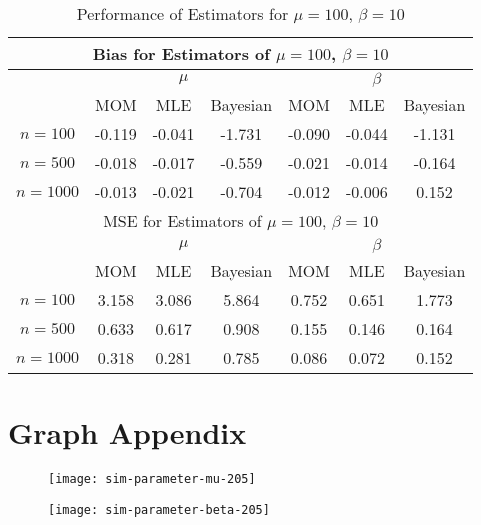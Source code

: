 \documentclass{svproc}
\begin{document}
\begin{table}[H]
\begin{center}
\caption{Performance of Estimators for $\mu = 100$, $\beta = 10$}
\begin{tabular}{|c|c|c|c|c|c|c|}
\hline
\multicolumn{7}{|c|}{Bias for Estimators of $\mu = 100$, $\beta = 10$}\\
\hline
  &\multicolumn{3}{|c|}{$\mu$} &\multicolumn{3}{|c|}{$\beta$}\\
\hline
 & MOM & MLE & Bayesian & MOM & MLE & Bayesian \\
\hline
$n = 100$ & -0.119 & -0.041 & -1.731 & -0.090 & -0.044 & -1.131\\
\hline
$n = 500$ & -0.018 & -0.017 & -0.559 & -0.021 & -0.014 & -0.164\\
\hline
$n = 1000$ & -0.013 & -0.021 & -0.704 & -0.012 & -0.006 & 0.152\\
\hline
\hline
\multicolumn{7}{|c|}{MSE for Estimators of $\mu = 100$, $\beta = 10$}\\
\hline
  &\multicolumn{3}{|c|}{$\mu$} &\multicolumn{3}{|c|}{$\beta$}\\
\hline
 & MOM & MLE & Bayesian & MOM & MLE & Bayesian \\
\hline
$n = 100$ & 3.158 & 3.086 & 5.864 & 0.752 & 0.651 & 1.773\\
\hline
$n = 500$ & 0.633 & 0.617 & 0.908 & 0.155 & 0.146 & 0.164\\
\hline
$n = 1000$ & 0.318 & 0.281 & 0.785 & 0.086 & 0.072 & 0.152\\
\hline
\end{tabular}
\medskip
\label{tab6}
\end{center}
\end{table}


\section{Graph Appendix}

\begin{figure}[H]
\begin{center}
\texttt{[image: sim-parameter-mu-205]}
\label{plot10}
\end{center}
\end{figure}

\begin{figure}[H]
\begin{center}
\texttt{[image: sim-parameter-beta-205]}
\label{plot11}
\end{center}
\end{figure}
\end{document}
